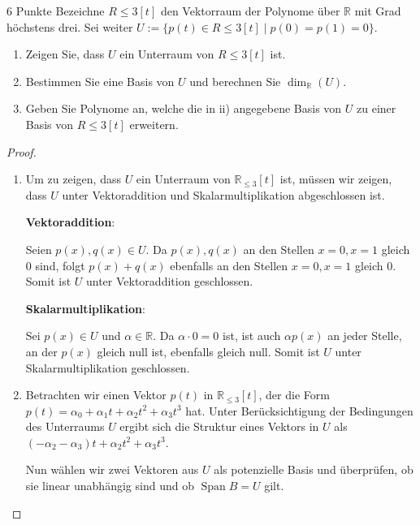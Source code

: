 \documentclass{problemset}
\begin{document}
\begin{problem}{6 Punkte}
Bezeichne $R\leq 3[t]$ den Vektorraum der Polynome über $\mathbb{R}$ mit Grad höchstens drei. Sei weiter $U := \{p(t) \in R\leq 3[t] \mid p(0) = p(1) = 0\}$.
\begin{enumerate}
    \item Zeigen Sie, dass $U$ ein Unterraum von $R\leq 3[t]$ ist.
    \item Bestimmen Sie eine Basis von $U$ und berechnen Sie $\dim_{\mathbb{R}}(U)$.
    \item Geben Sie Polynome an, welche die in ii) angegebene Basis von $U$ zu einer
          Basis von $R\leq 3[t]$ erweitern.
\end{enumerate}
\begin{proof}
    $ $

    \begin{enumerate}
        \item Um zu zeigen, dass $U$ ein Unterraum von $\mathbb{R}_{\leq 3}[t]$ ist, müssen
              wir zeigen, dass $U$ unter Vektoraddition und Skalarmultiplikation
              abgeschlossen ist.

              \textbf{Vektoraddition}:

              Seien $p(x), q(x) \in U$. Da $p(x), q(x)$ an den Stellen $x = 0, x = 1$ gleich
              0 sind, folgt $p(x) + q(x)$ ebenfalls an den Stellen $x = 0, x = 1$ gleich 0.
              Somit ist $U$ unter Vektoraddition geschlossen. \checkmark

              \textbf{Skalarmultiplikation}:

              Sei $p(x) \in U$ und $\alpha \in \mathbb{R}$. Da $\alpha \cdot 0 = 0$ ist, ist
              auch $\alpha p(x)$ an jeder Stelle, an der $p(x)$ gleich null ist, ebenfalls
              gleich null. Somit ist $U$ unter Skalarmultiplikation geschlossen. \checkmark
        \item Betrachten wir einen Vektor $p(t)$ in $\mathbb{R}_{\leq 3}[t]$, der die Form
              $p(t) = \alpha_0 + \alpha_1t + \alpha_2t^2 + \alpha_3t^3$ hat. Unter
              Berücksichtigung der Bedingungen des Unterraums $U$ ergibt sich die Struktur
              eines Vektors in $U$ als $(-\alpha_2 - \alpha_3)t + \alpha_2t^2 + \alpha_3t^3$.

              Nun wählen wir zwei Vektoren aus $U$ als potenzielle Basis und überprüfen, ob
              sie linear unabhängig sind und ob $\operatorname{Span} B = U$ gilt.


\end{enumerate}
\end{proof}
\end{problem}
\end{document}
